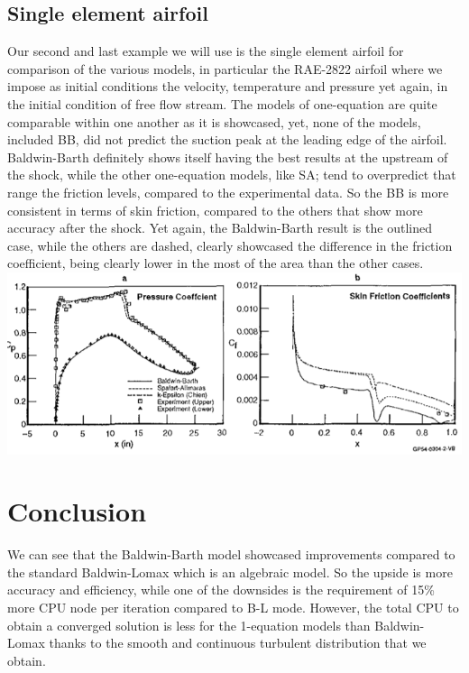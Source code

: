 \documentclass{article}
\begin{document}
\subsection{Single element airfoil}
Our second and last example we will use is the single element airfoil for comparison of the various models, in particular the RAE-2822 airfoil where we impose as initial conditions the velocity, temperature and pressure yet again, in the initial condition of free flow stream. The models of one-equation are quite comparable within one another as it is showcased, yet, none of the models, included BB, did not predict the suction peak at the leading edge of the airfoil. Baldwin-Barth definitely shows itself having the best results at the upstream of the shock, while the other one-equation models, like SA; tend to overpredict that range the friction levels, compared to the experimental data.
So the BB is more consistent in terms of skin friction, compared to the others that show more accuracy after the shock. Yet again, the Baldwin-Barth result is the outlined case, while the others are dashed, clearly showcased the difference in the friction coefficient, being clearly lower in the most of the area than the other cases.
\includegraphics[scale=0.8]{Graph2.PNG}

\section{Conclusion}
We can see that the Baldwin-Barth model showcased improvements compared to the standard Baldwin-Lomax which is an algebraic model. So the upside is more accuracy and efficiency, while one of the downsides is the requirement of 15\% more CPU node per iteration compared to B-L mode. However, the total CPU to obtain a converged solution is less for the 1-equation models than Baldwin-Lomax thanks to the smooth and continuous turbulent distribution that we obtain.
\end{document}
